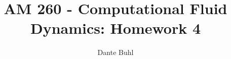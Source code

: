 \documentclass{article}
\begin{document}
\title{AM 260 - Computational Fluid Dynamics: Homework 4}
\author{Dante Buhl}


\newcommand{\wrms}{w_{\text{rms}}}
\newcommand{\bs}[1]{\boldsymbol{#1}}
\newcommand{\tb}[1]{\textbf{#1}}
\newcommand{\bmp}[1]{\begin{minipage}{#1\textwidth}}
\newcommand{\emp}{\end{minipage}}
\newcommand{\R}{\mathbb{R}}
\newcommand{\C}{\mathbb{C}}
\newcommand{\N}{\mathcal{N}}
\newcommand{\m}{\bs{\mu}_*}
\newcommand{\s}{\bs{\Sigma}_*}
\newcommand{\dt}{\Delta t}
\newcommand{\dx}{\Delta x}
\newcommand{\tr}[1]{\text{Tr}(#1)}
\newcommand{\Tr}[1]{\text{Tr}(#1)}
\newcommand{\Div}{\nabla \cdot}
\renewcommand{\div}{\nabla \cdot}
\newcommand{\Curl}{\nabla \times}
\newcommand{\Grad}{\nabla}
\newcommand{\grad}{\nabla}
\newcommand{\grads}{\nabla_s}
\newcommand{\gradf}{\nabla_f}
\newcommand{\xs}{x_s}
\newcommand{\x}{\bs{x}}
\newcommand{\xf}{x_f}
\newcommand{\ts}{t_s}
\newcommand{\tf}{t_f}
\newcommand{\pt}{\partial t}
\newcommand{\pz}{\partial z}
\newcommand{\uvec}{\bs{u}}
\newcommand{\bvec}{\bs{B}}
\newcommand{\nvec}{\hat{\bs{n}}}
\newcommand{\tu}{\tilde{\uvec}}
\newcommand{\B}{\bs{B}}
\newcommand{\A}{\bs{A}}
\newcommand{\jvec}{\bs{j}}
\newcommand{\F}{\bs{F}}
\newcommand{\T}{\tilde{T}}
\newcommand{\ez}{\bs{e}_z}
\newcommand{\ex}{\bs{e}_x}
\newcommand{\ey}{\bs{e}_y}
\newcommand{\eo}{\bs{e}_{\bs{\Omega}}}
\newcommand{\ppt}[1]{\frac{\partial #1}{\partial t}}
\newcommand{\pp}[2]{\frac{\partial #1}{\partial #2}}
\newcommand{\pptwo}[2]{\frac{\partial^2 #1}{\partial #2^2}}
\newcommand{\ddtwo}[2]{\frac{d^2 #1}{d #2^2}}
\newcommand{\DDt}[1]{\frac{D #1}{D t}}
\newcommand{\ppts}[1]{\frac{\partial #1}{\partial t_s}}
\newcommand{\pptf}[1]{\frac{\partial #1}{\partial t_f}}
\newcommand{\ppz}[1]{\frac{\partial #1}{\partial z}}
\newcommand{\ddz}[1]{\frac{d #1}{d z}}
\newcommand{\ppzetas}[1]{\frac{\partial^2 #1}{\partial \zeta^2}}
\newcommand{\ppzs}[1]{\frac{\partial #1}{\partial z_s}}
\newcommand{\ppzf}[1]{\frac{\partial #1}{\partial z_f}}
\newcommand{\ppx}[1]{\frac{\partial #1}{\partial x}}
\newcommand{\ddx}[1]{\frac{d #1}{d x}}
\newcommand{\ppxi}[1]{\frac{\partial #1}{\partial x_i}}
\newcommand{\ppxj}[1]{\frac{\partial #1}{\partial x_j}}
\newcommand{\ppy}[1]{\frac{\partial #1}{\partial y}}
\newcommand{\ppzeta}[1]{\frac{\partial #1}{\partial \zeta}}
\renewcommand{\k}{\bs{k}}
\newcommand{\real}[1]{\text{Re}\left[#1\right]}


\maketitle 
\setlength{\parindent}{0pt}
\end{document}
